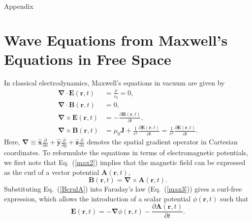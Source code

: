 
\begin{Appx}{Appendix}

\section{Wave Equations from Maxwell's Equations in Free Space}
\label{ch:Maxwell}

In classical electrodynamics, Maxwell's equations in vacuum are given by
\begin{align}
\boldsymbol{\nabla}\cdot\boldsymbol{E}(\boldsymbol{r}, t) &= \frac{\rho}{\epsilon_0} = 0,
\label{max1}\\
\boldsymbol{\nabla}\cdot\boldsymbol{B}(\boldsymbol{r}, t) &= 0,
\label{max2}\\
\boldsymbol{\nabla}\times\boldsymbol{E}(\boldsymbol{r}, t) &= -\frac{\partial \boldsymbol{B}(\boldsymbol{r}, t)}{\partial t},
\label{max3}\\
\boldsymbol{\nabla}\times\boldsymbol{B}(\boldsymbol{r}, t) &= \mu_0 \mathbf{J}
+ \frac{1}{c^2}\frac{\partial \boldsymbol{E}(\boldsymbol{r}, t)}{\partial t}
= \frac{1}{c^2}\frac{\partial \boldsymbol{E}(\boldsymbol{r}, t)}{\partial t}.
\label{max4}
\end{align}
Here, $\boldsymbol{\nabla}\equiv \hat{\boldsymbol{x}}\frac{\partial}{\partial x}
+\hat{\boldsymbol{y}}\frac{\partial}{\partial y}
+\hat{\boldsymbol{z}}\frac{\partial}{\partial z}$ denotes the spatial gradient operator in Cartesian coordinates.
To reformulate the equations in terms of electromagnetic potentials, we first note that Eq.~(\ref{max2}) implies that the magnetic field can be expressed as the curl of a vector potential $\boldsymbol{A}(\boldsymbol{r},t)$,
\begin{equation}
\boldsymbol{B}(\boldsymbol{r}, t) = \boldsymbol{\nabla}\times \boldsymbol{A}(\boldsymbol{r}, t).
\label{BcrulA}
\end{equation}
Substituting Eq.~(\ref{BcrulA}) into Faraday's law (Eq.~(\ref{max3})) gives a curl-free expression, which allows the introduction of a scalar potential $\phi(\boldsymbol{r},t)$ such that
\begin{equation}
\boldsymbol{E}(\boldsymbol{r}, t)
=
-\boldsymbol{\nabla}\phi(\boldsymbol{r}, t)
-
\frac{\partial \boldsymbol{A}(\boldsymbol{r}, t)}{\partial t}.
\label{gaugeF}
\end{equation}

\end{Appx}
